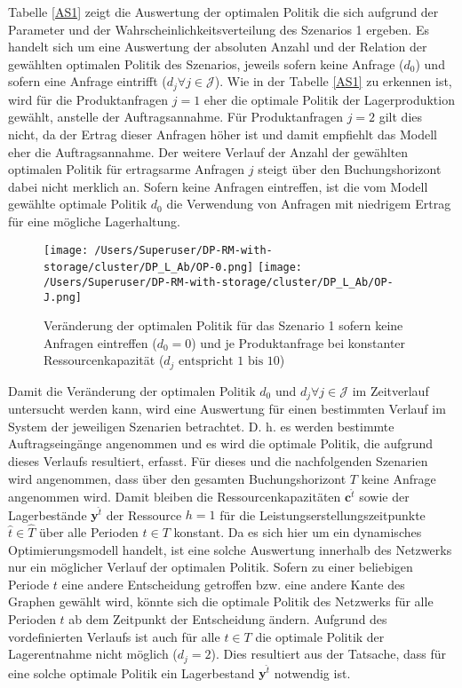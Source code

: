 Tabelle \ref{AS1} zeigt die Auswertung der optimalen Politik die sich aufgrund der Parameter und der Wahrscheinlichkeitsverteilung des Szenarios 1 ergeben. Es handelt sich um eine Auswertung der absoluten Anzahl und der Relation der gewählten optimalen Politik des Szenarios, jeweils sofern keine Anfrage ($d_0$) und sofern eine Anfrage eintrifft ($d_j\forall j \in\mathcal{J}$). Wie in der Tabelle \ref{AS1} zu erkennen ist, wird für die Produktanfragen $j=1$ eher die optimale Politik der Lagerproduktion gewählt, anstelle der Auftragsannahme. Für Produktanfragen $j=2$ gilt dies nicht, da der Ertrag dieser Anfragen höher ist und damit empfiehlt das Modell eher die Auftragsannahme. Der weitere Verlauf der Anzahl der gewählten optimalen Politik für ertragsarme Anfragen $j$ steigt über den Buchungshorizont dabei nicht merklich an. Sofern keine Anfragen eintreffen, ist die vom Modell gewählte optimale Politik $d_{0}$ die Verwendung von Anfragen mit niedrigem Ertrag für eine mögliche Lagerhaltung.

\begin{figure}[h!]     
\begin{center}
\texttt{[image: /Users/Superuser/DP-RM-with-storage/cluster/DP\_L\_Ab/OP-0.png]}
\texttt{[image: /Users/Superuser/DP-RM-with-storage/cluster/DP\_L\_Ab/OP-J.png]}
    \caption{Veränderung der optimalen Politik für das Szenario 1 sofern keine Anfragen eintreffen ($d_0=0$) und je Produktanfrage bei konstanter Ressourcenkapazität ($d_j\text{ entspricht }1\text{ bis }10$)}  \label{SV1}
  \end{center}
\end{figure}

Damit die Veränderung der optimalen Politik $d_0$ und $d_j \forall j \in \mathcal{J}$ im Zeitverlauf untersucht werden kann, wird eine Auswertung für einen bestimmten Verlauf im System der jeweiligen Szenarien betrachtet. D. h. es werden bestimmte Auftragseingänge angenommen und es wird die optimale Politik, die aufgrund dieses Verlaufs resultiert, erfasst. Für dieses und die nachfolgenden Szenarien wird angenommen, dass über den gesamten Buchungshorizont $T$ keine Anfrage angenommen wird. Damit bleiben die Ressourcenkapazitäten $\textbf{c}^{\hat t}$ sowie der Lagerbestände $\textbf{y}^{\hat t}$ der Ressource $h=1$ für die Leistungserstellungszeitpunkte $\hat t \in \hat T$ über alle Perioden $t\in T$ konstant. Da es sich hier um ein dynamisches Optimierungsmodell handelt, ist eine solche Auswertung innerhalb des Netzwerks nur ein möglicher Verlauf der optimalen Politik. Sofern zu einer beliebigen Periode $t$ eine andere Entscheidung getroffen bzw. eine andere Kante des Graphen gewählt wird, könnte sich die optimale Politik des Netzwerks für alle Perioden $t$ ab dem Zeitpunkt der Entscheidung ändern. Aufgrund des vordefinierten Verlaufs ist auch für alle $t \in T$ die optimale Politik der Lagerentnahme nicht möglich ($d_j=2$). Dies resultiert aus der Tatsache, dass für eine solche optimale Politik ein Lagerbestand $\textbf{y}^{\hat t}$ notwendig ist.

